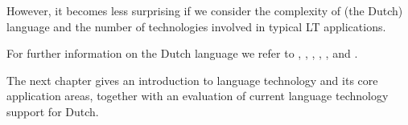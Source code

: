 \begin{multicols}{2}
    However, it becomes less surprising if we consider the complexity of (the Dutch) language and the number of technologies involved in typical LT applications.

    For further information on the Dutch language we refer to \cite{e-ans}, \cite{TUFenW}, \cite{NedWiki:Fries}, \cite{NedWiki:Nederlands}, \cite{NedWiki:Nedersaksisch},  \cite{Ethn-Dutch} and \cite{Ethn-LN}.

The next chapter gives an introduction to language technology and its core application areas, together with an evaluation of current language technology support for Dutch.
\end{multicols}

\clearpage



